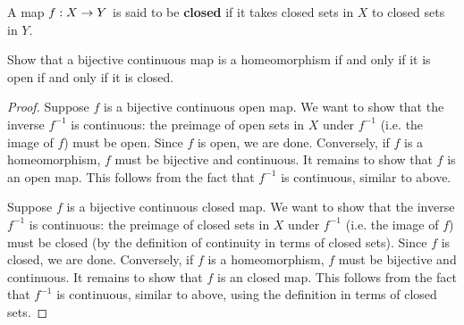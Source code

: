 \documentclass{mathnotes}
\begin{document}
\begin{defn}
    A map $f:X\rightarrow Y$ is said to be \textbf{closed} if it takes closed sets in $X$ to closed sets in $Y$.
\end{defn}

\begin{exc}
    Show that a bijective continuous map is a homeomorphism if and only if it is open if and only if it is closed.
\end{exc}
\begin{proof}
    Suppose $f$ is a bijective continuous open map. We want to show that the inverse $f^{-1}$ is continuous: the preimage of open sets in $X$ under
    $f^{-1}$ (i.e. the image of $f$) must be open. Since $f$ is open, we are done. Conversely, if $f$ is a homeomorphism, $f$ must be bijective
    and continuous. It remains to show that $f$ is an open map. This follows from the fact that $f^{-1}$ is continuous, similar to above.

    Suppose $f$ is a bijective continuous closed map. We want to show that the inverse $f^{-1}$ is continuous: the preimage of closed sets in $X$ under
    $f^{-1}$ (i.e. the image of $f$) must be closed (by the definition of continuity in terms of closed sets). Since $f$ is closed, we are done.
    Conversely, if $f$ is a homeomorphism, $f$ must be bijective and continuous. It remains to show that $f$ is an closed map. This follows from
    the fact that $f^{-1}$ is continuous, similar to above, using the definition in terms of closed sets.
\end{proof}
\end{document}
